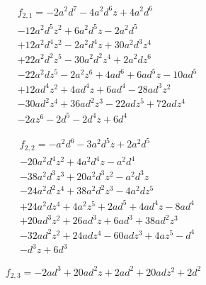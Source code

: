 \begin{equation}\begin{aligned}&f_{2,1}=- 2 a^{2} d^{7} - 4 a^{2} d^{6} z + 4 a^{2} d^{6} \\&- 12 a^{2} d^{5} z^{2} + 6 a^{2} d^{5} z - 2 a^{2} d^{5} \\&+ 12 a^{2} d^{4} z^{2} - 2 a^{2} d^{4} z + 30 a^{2} d^{3} z^{4} \\&+ 22 a^{2} d^{2} z^{5} - 30 a^{2} d^{2} z^{4} + 2 a^{2} d z^{6} \\&- 22 a^{2} d z^{5} - 2 a^{2} z^{6} + 4 a d^{6} + 6 a d^{5} z - 10 a d^{5} \\&+ 12 a d^{4} z^{2} + 4 a d^{4} z + 6 a d^{4} - 28 a d^{3} z^{2} \\&- 30 a d^{2} z^{4} + 36 a d^{2} z^{3} - 22 a d z^{5} + 72 a d z^{4} \\&- 2 a z^{6} - 2 d^{5} - 2 d^{4} z + 6 d^{4}\end{aligned}\end{equation}

\begin{equation}\begin{aligned}&f_{2,2}=- a^{2} d^{6} - 3 a^{2} d^{5} z + 2 a^{2} d^{5} \\&- 20 a^{2} d^{4} z^{2} + 4 a^{2} d^{4} z - a^{2} d^{4} \\&- 38 a^{2} d^{3} z^{3} + 20 a^{2} d^{3} z^{2} - a^{2} d^{3} z \\&- 24 a^{2} d^{2} z^{4} + 38 a^{2} d^{2} z^{3} - 4 a^{2} d z^{5} \\&+ 24 a^{2} d z^{4} + 4 a^{2} z^{5} + 2 a d^{5} + 4 a d^{4} z - 8 a d^{4} \\&+ 20 a d^{3} z^{2} + 26 a d^{3} z + 6 a d^{3} + 38 a d^{2} z^{3} \\&- 32 a d^{2} z^{2} + 24 a d z^{4} - 60 a d z^{3} + 4 a z^{5} - d^{4} \\&- d^{3} z + 6 d^{3}\end{aligned}\end{equation}

\begin{equation}f_{2,3}=- 2 a d^{3} + 20 a d^{2} z + 2 a d^{2} + 20 a d z^{2} + 2 d^{2}\end{equation}
